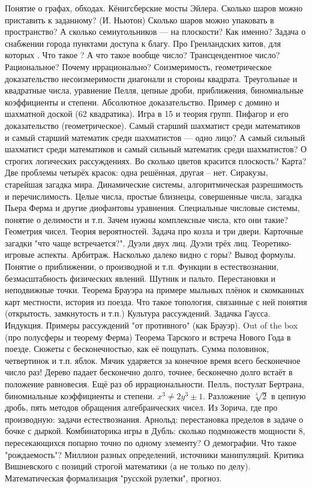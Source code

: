 Понятие о графах, обходах. Кёнигсберские мосты Эйлера.
Сколько шаров можно приставить к заданному? (И. Ньютон) Сколько шаров можно упаковать в пространство? А сколько семиугольников — на плоскости? Как именно? Задача о снабжении города пунктами доступа к благу.
Про Гренландских китов, для которых . Что такое \pi? А что такое вообще число? Трансцендентное число? Рациональное? Почему  иррационально? Соизмеримость, геометрическое доказательство несоизмеримости диагонали и стороны квадрата.
Треугольные и квадратные числа, уравнение Пелля, цепные дроби, приближения, биномиальные коэффициенты и степени.
Абсолютное доказательство. Пример с домино и шахматной доской (62 квадратика). Игра в 15 и теория групп. Пифагор и его доказательство (геометрическое).
Самый старший шахматист среди математиков и самый старший математик среди шахматистов — одно лицо? А самый сильный шахматист среди математиков и самый сильный математик среди шахматистов? О строгих логических рассуждениях.
Во сколько цветов красится плоскость? Карта? Две проблемы четырёх красок: одна решённая, другая – нет.
Сиракузы, старейшая загадка мира. Динамические системы, алгоритмическая разрешимость и перечислимость.
Целые числа, простые близнецы, совершенные числа, загадка Пьера Ферма и другие диофантовы уравнения. Специальные числовые системы, понятие о делимости и т.п. Зачем нужны комплексные числа, кто они такие? Геометрия чисел.
Теория вероятностей. Задача про козла и три двери. Карточные загадки "что чаще встречается?". Дуэли двух лиц. Дуэли трёх лиц. Теоретико-игровые аспекты. Арбитраж.
Насколько далеко видно с горы? Вывод формулы. Понятие о приближении, о производной и т.п. Функции в естествознании, безмасштабность физических явлений.
Шутник и пальто. Перестановки и неподвижные точки. Теорема Брауэра на примере мыльных плёнок и скомканных карт местности, история из поезда. Что такое топология, связанные с ней понятия (открытость, замкнутость и т.п.)
Культура рассуждений. Задачка Гаусса. Индукция. Примеры рассуждений "от противного" (как Брауэр). Out of the box (про полусферы и теорему Ферма)
Теорема Тарского и встреча Нового Года в поезде.
Сюжеты с бесконечностью, как её пощупать. Сумма половинок, четвертинок и т.п. яблок. Мячик ударяется за конечное время всего бесконечное число раз! Дерево падает бесконечно долго, точнее, бесконечно долго встаёт в положение равновесия.
Ещё раз об иррациональности. Пелль, постулат Бертрана, биномиальные коэффициенты и степени. $x^3 \ne 2y^3 \pm 1$. Разложение $\sqrt[3]{2}$ в цепную дробь, пять методов обращения алгебраических чисел.
Из Зорича, где про производную: задачи естествознания.
Арнольд: перестановка пределов в задаче о бочке с дыркой.
Комбинаторика игры в Дубль: сколько подмножеств мощности $8$, пересекающихся попарно точно по одному элементу?
О демографии. Что такое "рождаемость"? Миллион разных определений, источники манипуляций. Критика Вишневского с позиций строгой математики (а не только по делу).
Математическая формализация "русской рулетки", прогноз.


